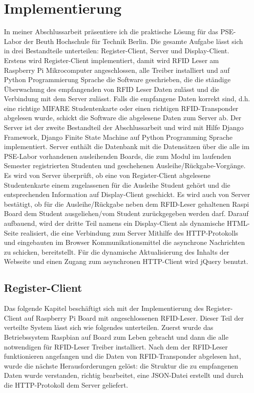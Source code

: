 \chapter{Implementierung}
\label{sec:imp}
In meiner Abschlussarbeit präsentiere ich die praktische Lösung für das PSE-Labor der Beuth Hochschule für Technik Berlin. Die gesamte Aufgabe lässt sich in drei Bestandteile unterteilen: Register-Client, Server und Display-Client. Erstens wird Register-Client implementiert, damit wird RFID Leser am Raspberry Pi Mikrocomputer angeschlossen, alle Treiber installiert und auf Python Programmierung Sprache die Software geschrieben, die die ständige Überwachung des empfangenden von RFID Leser Daten zulässt und die Verbindung mit dem Server zulässt. Falls die empfangene Daten korrekt sind, d.h.  eine richtige MIFARE Studentenkarte oder einen richtigen RFID-Transponder abgelesen wurde, schickt die Software die abgelesene Daten zum Server ab. Der Server ist der zweite Bestandteil der Abschlussarbeit und wird mit Hilfe Django Framework, Django Finite State Machine auf Python Programming Sprache implementiert. Server enthält die Datenbank mit die Datensätzen über die alle im PSE-Labor vorhandenen ausleihenden Boards, die zum Modul im laufenden Semester registrierten Studenten und  geschehenen Ausleihe/Rückgabe-Vorgänge. Es wird von Server überprüft, ob eine von Register-Client abgelesene Studentenkarte einem zugelassenen für die Ausleihe Student gehört und die entsprechenden Information auf Display-Client geschickt. Es wird auch von Server bestätigt, ob für die Ausleihe/Rückgabe neben dem RFID-Leser gehaltenen Raspi Board dem Student ausgeliehen/vom Student zurückgegeben werden darf. Darauf aufbauend, wird der dritte Teil namens ein Display-Client als dynamische HTML-Seite realisiert, die eine Verbindung zum Server Mithilfe des HTTP-Protokolls und eingebauten im Browser Kommunikationsmittel die asynchrone Nachrichten zu schicken, bereitstellt. Für die dynamische Aktualisierung des Inhalts der Webseite und einen Zugang zum asynchronen HTTP-Client wird jQuery benutzt.
\section{Register-Client}
\label{sec:register_client}
Das folgende Kapitel beschäftigt sich mit der Implementierung des Register-Client auf Raspberry Pi Board mit angeschlossenen RFID-Leser. Dieser Teil der verteilte System lässt sich wie folgendes unterteilen. Zuerst wurde das Betriebssystem Raspbian auf Board zum Leben gebracht und dann die alle notwendigen für RFID-Leser Treiber installiert. Nach dem der RFID-Leser funktionieren angefangen und die Daten von RFID-Transponder abgelesen hat, wurde die nächste Herausforderungen gelöst: die Struktur die zu empfangenen Daten wurde verstanden, richtig bearbeitet, eine JSON-Datei erstellt und durch die HTTP-Protokoll dem Server geliefert. 

